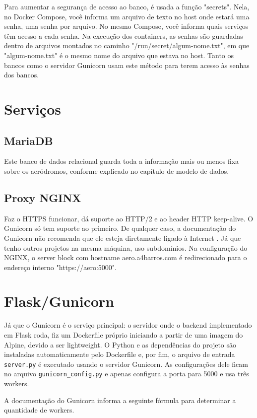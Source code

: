 Para aumentar a segurança de acesso ao banco, é usada a função "secrets". Nela, no Docker Compose,
você informa um arquivo de texto no host onde estará uma senha, uma senha por arquivo. No mesmo Compose,
você informa quais serviços têm acesso a cada senha. Na execução dos containers, as senhas são
guardadas dentro de arquivos montados no caminho "/run/secret/algum-nome.txt", em que "algum-nome.txt" é
o mesmo nome do arquivo que estava no host.
Tanto os bancos como o servidor Gunicorn usam este método para terem acesso às senhas dos bancos.

\section{Serviços}

\subsection{MariaDB}
Este banco de dados relacional guarda toda a informação mais ou menos fixa sobre os aeródromos,
conforme explicado no capítulo de modelo de dados.

\subsection{Proxy NGINX}
Faz o HTTPS funcionar, dá suporte ao HTTP/2 e ao header HTTP keep-alive. O Gunicorn só tem suporte
ao primeiro. De qualquer caso, a documentação do Gunicorn não recomenda que ele esteja diretamente
ligado à Internet \cite{nginx-gunicorn}. Já que tenho outros projetos na mesma máquina, uso subdomínios.
Na configuração do NGINX, o server block com hostname aero.a4barros.com é redirecionado para 
o endereço interno "https://aero:5000".

\section{Flask/Gunicorn}

Já que o Gunicorn é o serviço principal: o servidor onde o backend implementado em Flask roda,
fiz um Dockerfile próprio iniciando a partir de uma imagem do Alpine, devido a ser lightweight.
O Python e as dependências do projeto são instaladas automaticamente pelo Dockerfile e, por
fim, o arquivo de entrada \texttt{server.py} é executado usando o servidor Gunicorn. As configurações
dele ficam no arquivo \texttt{gunicorn\_config.py} e apenas configura a porta para 5000 e usa três workers.

A documentação do Gunicorn informa a seguinte fórmula para determinar a quantidade de workers. \cite{number-work}


